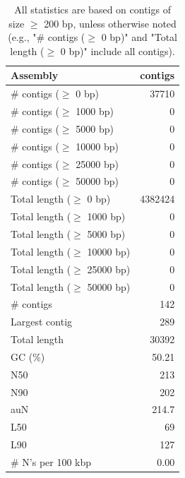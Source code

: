 \documentclass[12pt,a4paper]{article}
\begin{document}
\begin{table}[ht]
\begin{center}
\caption{All statistics are based on contigs of size $\geq$ 200 bp, unless otherwise noted (e.g., "\# contigs ($\geq$ 0 bp)" and "Total length ($\geq$ 0 bp)" include all contigs).}
\begin{tabular}{|l*{1}{|r}|}
\hline
Assembly & contigs \\ \hline
\# contigs ($\geq$ 0 bp) & 37710 \\ \hline
\# contigs ($\geq$ 1000 bp) & 0 \\ \hline
\# contigs ($\geq$ 5000 bp) & 0 \\ \hline
\# contigs ($\geq$ 10000 bp) & 0 \\ \hline
\# contigs ($\geq$ 25000 bp) & 0 \\ \hline
\# contigs ($\geq$ 50000 bp) & 0 \\ \hline
Total length ($\geq$ 0 bp) & 4382424 \\ \hline
Total length ($\geq$ 1000 bp) & 0 \\ \hline
Total length ($\geq$ 5000 bp) & 0 \\ \hline
Total length ($\geq$ 10000 bp) & 0 \\ \hline
Total length ($\geq$ 25000 bp) & 0 \\ \hline
Total length ($\geq$ 50000 bp) & 0 \\ \hline
\# contigs & 142 \\ \hline
Largest contig & 289 \\ \hline
Total length & 30392 \\ \hline
GC (\%) & 50.21 \\ \hline
N50 & 213 \\ \hline
N90 & 202 \\ \hline
auN & 214.7 \\ \hline
L50 & 69 \\ \hline
L90 & 127 \\ \hline
\# N's per 100 kbp & 0.00 \\ \hline
\end{tabular}
\end{center}
\end{table}
\end{document}
